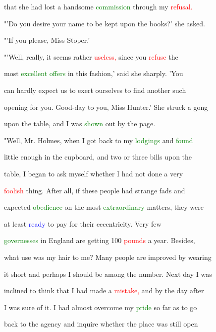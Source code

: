  that she had \textcolor{BurntOrange}{lost} a handsome \textcolor{green}{commission} through my \textcolor{red}{refusal.}



 "'Do you desire your name to be kept upon the books?' she asked.



 "'If you please, Miss Stoper.'



 "'Well, really, it seems rather \textcolor{red}{useless,} since you \textcolor{red}{refuse} the

 most \textcolor{green}{excellent} \textcolor{green}{offers} in this fashion,' said she sharply. 'You

 can hardly \textcolor{BurntOrange}{expect} us to exert ourselves to find another such

 opening for you. Good-day to you, Miss \textcolor{BurntOrange}{Hunter.'} She struck a gong

 upon the table, and I was \textcolor{green}{shown} out by the page.



 "Well, Mr. Holmes, when I got back to my \textcolor{green}{lodgings} and \textcolor{green}{found}

 little enough in the cupboard, and two or three bills upon the

 table, I began to ask myself whether I had not done a very

 \textcolor{red}{foolish} thing. After all, if these people had strange fads and

 \textcolor{BurntOrange}{expected} \textcolor{green}{obedience} on the most \textcolor{green}{extraordinary} matters, they were

 at least \textcolor{blue}{ready} to \textcolor{BurntOrange}{pay} for their eccentricity. Very few

 \textcolor{green}{governesses} in England are getting 100 \textcolor{red}{pounds} a year. Besides,

 what use was my hair to me? Many people are \textcolor{BurntOrange}{improved} by \textcolor{BurntOrange}{wearing}

 it short and perhaps I should be among the number. Next day I was

 inclined to think that I had made a \textcolor{red}{mistake,} and by the day after

 I was sure of it. I had almost overcome my \textcolor{green}{pride} so far as to go

 back to the agency and inquire whether the place was still open

